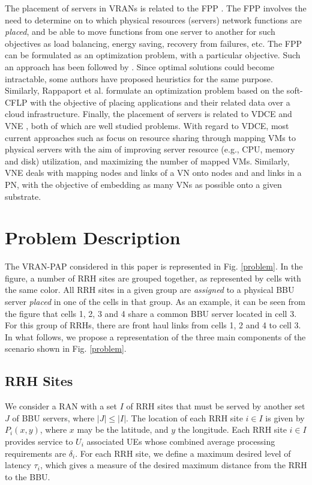\documentclass[conference]{IEEEtran}
\begin{document}
\indent The placement of servers in \acp{VRAN} is related to the \ac{FPP} \cite{MijumbiNFV15}. The \ac{FPP} involves the need to determine on to which physical resources (servers) network functions are \textit{placed}, and be able to move functions from one server to another for such objectives as load balancing, energy saving, recovery from failures, etc. The \ac{FPP} can be formulated as an optimization problem, with a particular objective. Such an approach has been followed by \cite{BastaA2014, Moens14, Bagaa14}. Since optimal solutions could become intractable, some authors \cite{MijumbiNFV15, Xia15, Yoshida14} have proposed heuristics for the same purpose. Similarly, Rappaport et al. \cite{Rappaport13} formulate an optimization problem based on the soft-\ac{CFLP} with the objective of placing applications and their related data over a cloud infrastructure. Finally, the placement of servers is related to \ac{VDCE} \cite{BariCST13} and \ac{VNE} \cite{ShidIM15, path, rl, aims, sdn, neurofuzzy, neural}, both of which are well studied problems. With regard to \ac{VDCE}, most current approaches such as \cite{MengXia10, RabbaniMG13} focus on resource sharing through mapping \acp{VM} to physical servers with the aim of improving server resource (e.g., CPU, memory and disk) utilization, and maximizing the number of mapped \acp{VM}. Similarly, \ac{VNE} deals with mapping nodes and links of a \ac{VN} onto nodes and and links in a \ac{PN}, with the objective of embedding as many \acp{VN} as possible onto a given substrate.

\section{Problem Description} \label{desc}
The \ac{VRAN-PAP} considered in this paper is represented in Fig. \ref{problem}. In the figure, a number of \ac{RRH} sites  are grouped together, as represented by cells with the same color. All RRH sites in a given group are \textit{assigned} to a physical BBU server \textit{placed} in one of the cells in that group. As an example, it can be seen from the figure that cells 1, 2, 3 and 4 share a common BBU server located in cell 3. For this group of RRHs, there are front haul links from cells 1, 2 and 4 to cell 3. In what follows, we propose a representation of the three main components of the scenario shown in Fig. \ref{problem}.
\subsection{\ac{RRH} Sites}
We consider a \ac{RAN} with a set $I$ of \ac{RRH} sites that must be served by another set $J$ of BBU servers, where $|J| \leq |I|$. The location of each \ac{RRH} site $i \in I$ is given by $P_i(x,y)$, where $x$ may be the latitude, and $y$ the longitude. Each \ac{RRH} site $i \in I$ provides service to $U_i$ associated \acp{UE} whose combined average processing requirements are $\delta_i$. For each \ac{RRH} site, we define a maximum desired level of latency $\tau_i$, which gives a measure of the desired maximum distance from the \ac{RRH} to the \ac{BBU}. 
\end{document}
